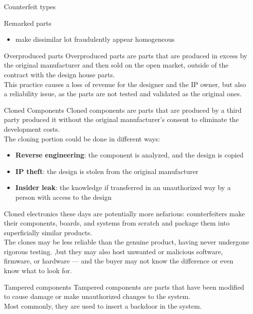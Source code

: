 \begin{section}{Counterfeit types}
\begin{subsection}{Remarked parts}
\begin{itemize}
      \item make dissimilar lot fraudulently appear homogeneous
    \end{itemize}
  \end{subsection}
  \begin{subsection}{Overproduced parts}
    Overproduced parts are parts that are produced in excess by the original manufacturer and then
    sold on the open market, outside of the contract with the design house parts.\\
    This practice causes a loss of revenue for the designer and the IP owner, but also a reliability 
    issue, as the parts are not tested and validated as the original ones.
  \end{subsection}
  \begin{subsection}{Cloned Components}
    Cloned components are parts that are produced by a third party produced it without the original
    manufacturer's consent to eliminate the development costs.\\
    The cloning portion could be done in different ways:
    \begin{itemize}
      \item \textbf{Reverse engineering}: the component is analyzed, and the design is copied
      \item \textbf{IP theft}: the design is stolen from the original manufacturer
      \item \textbf{Insider leak}: the knowledge if transferred in an unauthorized way by a person
        with access to the design
    \end{itemize}
    Cloned electronics these days are potentially more nefarious: counterfeiters make their
    components, boards, and systems from scratch and package them into superficially similar
    products.\\
    The clones may be less reliable than the genuine product, having never undergone rigorous
    testing. ,but they may also host unwanted or malicious software, firmware, or hardware — and the
    buyer may not know the difference or even know what to look for.
  \end{subsection}
  \begin{subsection}{Tampered components}
    Tampered components are parts that have been modified to cause damage or make unauthorized 
    changes to the system.\\
    Most commonly, they are used to insert a backdoor in the system.
  \end{subsection}
\end{section}

